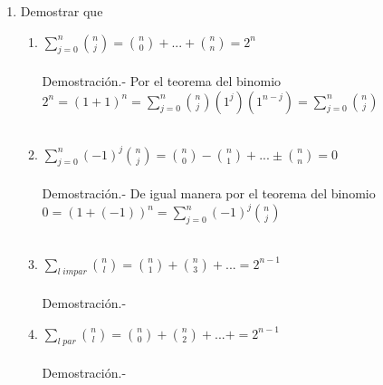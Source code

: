 \begin{ej}
\begin{enumerate}[\bfseries a)]
\item Demostrar que 
\begin{enumerate}[\bfseries i)]
\item $\displaystyle\sum_{j=0}^{n} {n \choose j} = {n \choose 0} + ... + {n \choose n} = 2^n$\\\\
Demostración.- \; Por el teorema del binomio $2^n=(1+1)^n = \displaystyle\sum_{j=0}^n {n \choose j}(1^j)(1^{n-j})=\sum_{j=0}^n {n \choose j}$\\\\

\item $\displaystyle\sum_{j=0}^n (-1)^j {n \choose j} = {n \choose 0}- {n \choose 1}+...\pm {n \choose n} =0$\\\\
Demostración.- \;  De igual manera por el teorema del binomio $0=(1+(-1))^n = \displaystyle\sum_{j=0}^n(-1)^j {n \choose j}$\\\\ 

\item $\displaystyle\sum_{l \; impar} {n \choose l} = {n \choose 1} + {n \choose 3}+ ... = 2^{n-1}$\\\\
Demostración.- \;  

\item $\displaystyle\sum_{l \; par} {n \choose l} = {n \choose 0} + {n \choose 2} + ... + = 2^{n-1}$\\\\
Demostración.- \;
\end{enumerate}

\end{enumerate}
\end{ej}